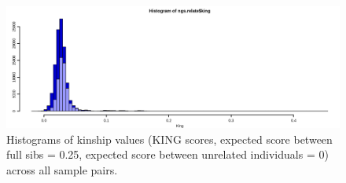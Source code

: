 \documentclass[a4paper,12pt]{article}
\begin{document}
\begin{figure}[h]
	\hspace*{-1cm}
	\includegraphics*[width = 7in]{../../NGSrelate/full_relatedness_tanzania/king_histogram.png}
	\caption{\footnotesize Histograms of kinship values (KING scores, expected score between full sibs = 0.25, expected score between unrelated individuals = 0) across all sample pairs.}
	\label{FigM1}
\end{figure}

\clearpage


\printbibliography
\end{document}
